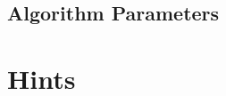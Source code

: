 \subsection{Algorithm Parameters} \label{ssec:algorithmParameters}




\section{Hints} \label{sec:hints}

